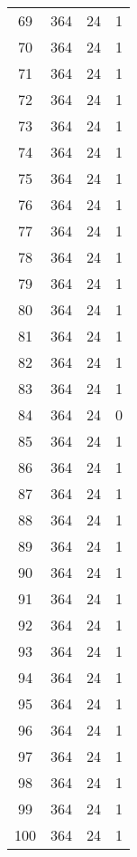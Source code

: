 \begin{longtable}[!]{c|ccc}
	69	& 364	& 24	& 1	\\
	70	& 364	& 24	& 1	\\
	71	& 364	& 24	& 1	\\
	72	& 364	& 24	& 1	\\
	73	& 364	& 24	& 1	\\
	74	& 364	& 24	& 1	\\
	75	& 364	& 24	& 1	\\
	76	& 364	& 24	& 1	\\
	77	& 364	& 24	& 1	\\
	78	& 364	& 24	& 1	\\
	79	& 364	& 24	& 1	\\
	80	& 364	& 24	& 1	\\
	81	& 364	& 24	& 1	\\
	82	& 364	& 24	& 1	\\
	83	& 364	& 24	& 1	\\
	84	& 364	& 24	& 0	\\
	85	& 364	& 24	& 1	\\
	86	& 364	& 24	& 1	\\
	87	& 364	& 24	& 1	\\
	88	& 364	& 24	& 1	\\
	89	& 364	& 24	& 1	\\
	90	& 364	& 24	& 1	\\
	91	& 364	& 24	& 1	\\
	92	& 364	& 24	& 1	\\
	93	& 364	& 24	& 1	\\
	94	& 364	& 24	& 1	\\
	95	& 364	& 24	& 1	\\
	96	& 364	& 24	& 1	\\
	97	& 364	& 24	& 1	\\
	98	& 364	& 24	& 1	\\
	99	& 364	& 24	& 1	\\
	100	& 364	& 24	& 1	\\
\end{longtable}


